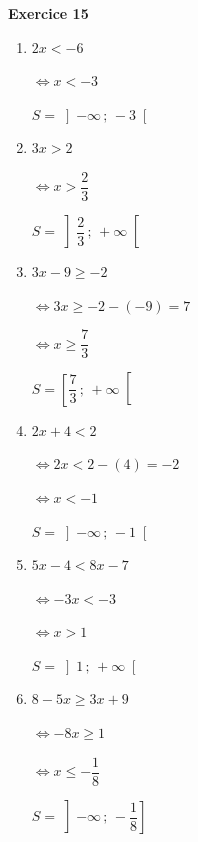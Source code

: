 \documentclass[12pt,a4paper,french]{article}
\begin{document}
\noindent\textbf{Exercice 15}\par
\smallskip
\begin{enumerate}
\item $2x < -6$

$\Leftrightarrow x < -3$

$S = \left] -\infty \,;\, -3 \right[$
\item $3x > 2$

$\Leftrightarrow x > \dfrac{2}{3}$

$S = \left] \dfrac{2}{3} \,;\, +\infty \right[$
\item $3 x - 9 \geq -2$

$\Leftrightarrow 3x \geq -2 - (-9) = 7$

$\Leftrightarrow x \geq \dfrac{7}{3}$

$S = \left[ \dfrac{7}{3} \,;\, +\infty \right[$
\item $2 x + 4 < 2$

$\Leftrightarrow 2x < 2 - (4) = -2$

$\Leftrightarrow x < -1$

$S = \left] -\infty \,;\, -1 \right[$
\item $5 x - 4 < 8 x - 7$

$\Leftrightarrow -3x < -3$

$\Leftrightarrow x > 1$

$S = \left] 1 \,;\, +\infty \right[$
\item $8 - 5 x \geq 3 x + 9$

$\Leftrightarrow -8x \geq 1$

$\Leftrightarrow x \leq - \dfrac{1}{8}$

$S = \left] -\infty \,;\, - \dfrac{1}{8} \right]$
\end{enumerate}
\medskip
\end{document}
